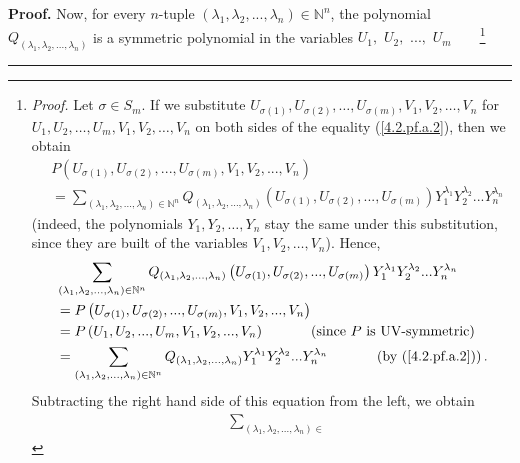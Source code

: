 \documentclass[numbers=enddot,12pt,final,onecolumn,notitlepage]{scrartcl}%
\newenvironment{proof}[1][Proof]{\noindent\textbf{#1.} }{\ \rule{0.5em}{0.5em}}
\begin{document}
\begin{proof}
Now, for every $n$-tuple $\left(  \lambda_{1},\lambda_{2},...,\lambda
_{n}\right)  \in\mathbb{N}^{n}$, the polynomial $Q_{\left(  \lambda
_{1},\lambda_{2},...,\lambda_{n}\right)  }$ is a symmetric polynomial in the
variables $U_{1},$ $U_{2},$ $...,$ $U_{m}$\ \ \ \ \footnote{\textit{Proof.}
Let $\sigma\in S_{m}$. If we substitute $U_{\sigma\left(  1\right)
},U_{\sigma\left(  2\right)  },\ldots,U_{\sigma\left(  m\right)  },V_{1}%
,V_{2},\ldots,V_{n}$ for $U_{1},U_{2},\ldots,U_{m},V_{1},V_{2},\ldots,V_{n}$
on both sides of the equality (\ref{4.2.pf.a.2}), then we obtain%
\begin{align*}
&  P\left(  U_{\sigma\left(  1\right)  },U_{\sigma\left(  2\right)
},...,U_{\sigma\left(  m\right)  },V_{1},V_{2},...,V_{n}\right) \\
&  =\sum_{\left(  \lambda_{1},\lambda_{2},...,\lambda_{n}\right)
\in\mathbb{N}^{n}}Q_{\left(  \lambda_{1},\lambda_{2},\ldots,\lambda
_{n}\right)  }\left(  U_{\sigma\left(  1\right)  },U_{\sigma\left(  2\right)
},...,U_{\sigma\left(  m\right)  }\right)  Y_{1}^{\lambda_{1}}Y_{2}%
^{\lambda_{2}}...Y_{n}^{\lambda_{n}}%
\end{align*}
(indeed, the polynomials $Y_{1},Y_{2},\ldots,Y_{n}$ stay the same under this
substitution, since they are built of the variables $V_{1},V_{2},\ldots,V_{n}%
$). Hence,%
\begin{align*}
&  \sum_{\left(  \lambda_{1},\lambda_{2},...,\lambda_{n}\right)  \in
\mathbb{N}^{n}}Q_{\left(  \lambda_{1},\lambda_{2},\ldots,\lambda_{n}\right)
}\left(  U_{\sigma\left(  1\right)  },U_{\sigma\left(  2\right)
},...,U_{\sigma\left(  m\right)  }\right)  Y_{1}^{\lambda_{1}}Y_{2}%
^{\lambda_{2}}...Y_{n}^{\lambda_{n}}\\
&  =P\left(  U_{\sigma\left(  1\right)  },U_{\sigma\left(  2\right)
},...,U_{\sigma\left(  m\right)  },V_{1},V_{2},...,V_{n}\right) \\
&  =P\left(  U_{1},U_{2},...,U_{m},V_{1},V_{2},...,V_{n}\right)
\ \ \ \ \ \ \ \ \ \ \left(  \text{since }P\text{ is UV-symmetric}\right) \\
&  =\sum_{\left(  \lambda_{1},\lambda_{2},...,\lambda_{n}\right)
\in\mathbb{N}^{n}}Q_{\left(  \lambda_{1},\lambda_{2},\ldots,\lambda
_{n}\right)  }Y_{1}^{\lambda_{1}}Y_{2}^{\lambda_{2}}...Y_{n}^{\lambda_{n}%
}\ \ \ \ \ \ \ \ \ \ \left(  \text{by (\ref{4.2.pf.a.2})}\right)  .
\end{align*}
Subtracting the right hand side of this equation from the left, we obtain%
\begin{align}
&  \sum_{\left(  \lambda_{1},\lambda_{2},...,\lambda_{n}\right)  \in
}
\end{align}}
\end{proof}
\end{document}
